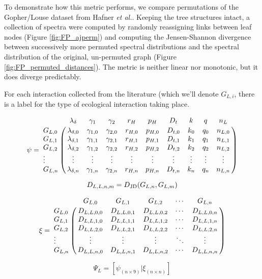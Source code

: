 \noindent To demonstrate how this metric performs, we compare permutations of the Gopher/Louse dataset from Hafner {\em et al.}. Keeping the tree structures intact, a collection of spectra were computed by randomly reassigning links between leaf nodes (Figure \ref{fig:FP_ajperm}) and computing the Jensen-Shannon divergence between successively more permuted spectral distributions and the spectral distribution of the original, un-permuted graph (Figure \ref{fig:FP_permuted_distances}). The metric is neither linear nor monotonic, but it does diverge predictably. 







For each interaction collected from the literature (which we'll denote $G_{L,i}$, there is a label for the type of ecological interaction taking place.




\begin{equation}
\psi =
\bordermatrix{
        & \lambda_{\delta}   & \gamma_{1}   & \gamma_{2}   & r_{H}   & p_{H}   & D_{t}   & k      & q      & n_{L}   \cr
G_{L,0} & \lambda_{\delta,0} & \gamma_{1,0} & \gamma_{2,0} & r_{H,0} & p_{H,0} & D_{t,0} & k_{0}  & q_{0}  & n_{L,0} \cr
G_{L,1} & \lambda_{\delta,1} & \gamma_{1,1} & \gamma_{2,1} & r_{H,1} & p_{H,1} & D_{t,1} & k_{1}  & q_{1}  & n_{L,1} \cr
G_{L,2} & \lambda_{\delta,2} & \gamma_{1,2} & \gamma_{2,2} & r_{H,2} & p_{H,2} & D_{t,2} & k_{2}  & q_{2}  & n_{L,2} \cr
\vdots  & \vdots             & \vdots       & \vdots       & \vdots  & \vdots  & \vdots  & \vdots & \vdots & \vdots  \cr 
G_{L,n} & \lambda_{\delta,n} & \gamma_{1,n} & \gamma_{2,n} & r_{H,n} & p_{H,n} & D_{t,n} & k_{n}  & q_{n}  & n_{L,n} \cr
}
\end{equation}

\begin{equation}
    D_{L,L,n,m} = D_{\rm JD}( G_{L,n}, G_{L,m} )
\end{equation}

\begin{equation}
\xi =
\bordermatrix{
        & G_{L,0}     & G_{L,1}     & G_{L,2}     & \cdots & G_{L,n}     \cr
G_{L,0} & D_{L,L,0,0} & D_{L,L,0,1} & D_{L,L,0,2} & \cdots & D_{L,L,0,n} \cr
G_{L,1} & D_{L,L,1,0} & D_{L,L,1,1} & D_{L,L,1,2} & \cdots & D_{L,L,1,n} \cr
G_{L,2} & D_{L,L,2,0} & D_{L,L,2,1} & D_{L,L,2,2} & \cdots & D_{L,L,2,n} \cr
\vdots  & \vdots      & \vdots      & \vdots      & \ddots & \vdots      \cr
G_{L,n} & D_{L,L,n,0} & D_{L,L,n,1} & D_{L,L,n,2} & \cdots & D_{L,L,n,n} \cr
}
\end{equation}

\begin{equation}
    \Psi_{L} = \left[ \psi_{(n \times 9)} | \xi_{(n \times n)} \right]
\end{equation}